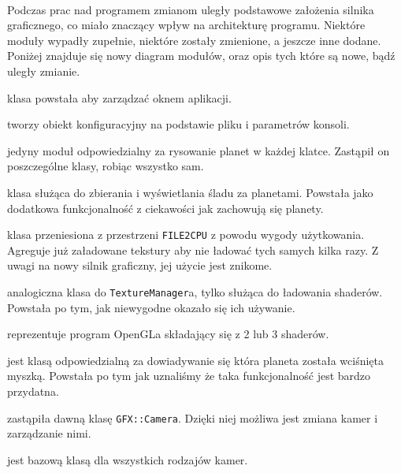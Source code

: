 \paragraph{}

Podczas prac nad programem zmianom uległy podstawowe założenia silnika graficznego, co miało znaczący wpływ na architekturę programu. Niektóre moduły wypadły zupełnie, niektóre zostały zmienione, a jeszcze inne dodane. Poniżej znajduje się nowy diagram modułów, oraz opis tych które są nowe, bądź uległy zmianie.


\begin{description}
\item[\texttt{Window}] klasa powstała aby zarządzać oknem aplikacji.
\item[\texttt{Options}] tworzy obiekt konfiguracyjny na podstawie pliku i parametrów konsoli.
\item{}
\item[\texttt{GFX::DeferredRenderer}] jedyny moduł odpowiedzialny za rysowanie planet w każdej klatce. Zastąpił on poszczególne klasy, robiąc wszystko sam.
\item[\texttt{GFX::PlanetsTracer}] klasa służąca do zbierania i wyświetlania śladu za planetami. Powstała jako dodatkowa funkcjonalność z ciekawości jak zachowują się planety.
\item[\texttt{GFX::TexturesManager}] klasa przeniesiona z przestrzeni \texttt{FILE2CPU} z powodu wygody użytkowania. Agreguje już załadowane tekstury aby nie ładować tych samych kilka razy. Z uwagi na nowy silnik graficzny, jej użycie jest znikome.
\item[\texttt{GFX::ShaderManager}] analogiczna klasa do \texttt{TextureManager}a, tylko służąca do ładowania shaderów. Powstała po tym, jak niewygodne okazało się ich używanie.
\item[\texttt{GFX::Program}] reprezentuje program OpenGLa składający się z 2 lub 3 shaderów.
\item{}
\item[\texttt{UI::PlanetzPicker}] jest klasą odpowiedzialną za dowiadywanie się która planeta została wciśnięta myszką. Powstała po tym jak uznaliśmy że taka funkcjonalność jest bardzo przydatna.
\item[\texttt{UI::CameraMgr}] zastąpiła dawną klasę \texttt{GFX::Camera}. Dzięki niej możliwa jest zmiana kamer i zarządzanie nimi.
\item[\texttt{UI::Camera}] jest bazową klasą dla wszystkich rodzajów kamer.
\end{description}
